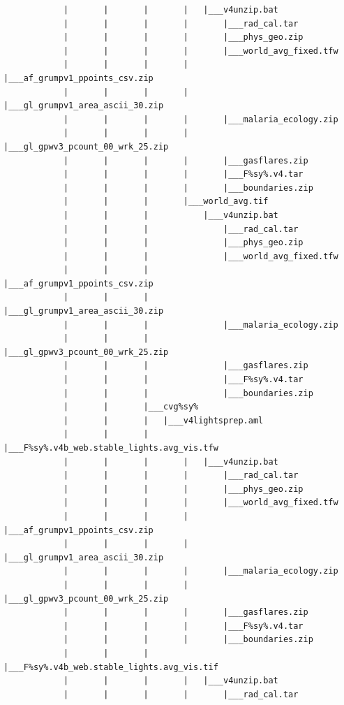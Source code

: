 \documentclass[]{book}
\begin{document}
\begin{verbatim}
            |       |       |       |   |___v4unzip.bat
            |       |       |       |       |___rad_cal.tar
            |       |       |       |       |___phys_geo.zip
            |       |       |       |       |___world_avg_fixed.tfw
            |       |       |       |       |___af_grumpv1_ppoints_csv.zip
            |       |       |       |       |___gl_grumpv1_area_ascii_30.zip
            |       |       |       |       |___malaria_ecology.zip
            |       |       |       |       |___gl_gpwv3_pcount_00_wrk_25.zip
            |       |       |       |       |___gasflares.zip
            |       |       |       |       |___F%sy%.v4.tar
            |       |       |       |       |___boundaries.zip
            |       |       |       |___world_avg.tif
            |       |       |           |___v4unzip.bat
            |       |       |               |___rad_cal.tar
            |       |       |               |___phys_geo.zip
            |       |       |               |___world_avg_fixed.tfw
            |       |       |               |___af_grumpv1_ppoints_csv.zip
            |       |       |               |___gl_grumpv1_area_ascii_30.zip
            |       |       |               |___malaria_ecology.zip
            |       |       |               |___gl_gpwv3_pcount_00_wrk_25.zip
            |       |       |               |___gasflares.zip
            |       |       |               |___F%sy%.v4.tar
            |       |       |               |___boundaries.zip
            |       |       |___cvg%sy%
            |       |       |   |___v4lightsprep.aml
            |       |       |       |___F%sy%.v4b_web.stable_lights.avg_vis.tfw
            |       |       |       |   |___v4unzip.bat
            |       |       |       |       |___rad_cal.tar
            |       |       |       |       |___phys_geo.zip
            |       |       |       |       |___world_avg_fixed.tfw
            |       |       |       |       |___af_grumpv1_ppoints_csv.zip
            |       |       |       |       |___gl_grumpv1_area_ascii_30.zip
            |       |       |       |       |___malaria_ecology.zip
            |       |       |       |       |___gl_gpwv3_pcount_00_wrk_25.zip
            |       |       |       |       |___gasflares.zip
            |       |       |       |       |___F%sy%.v4.tar
            |       |       |       |       |___boundaries.zip
            |       |       |       |___F%sy%.v4b_web.stable_lights.avg_vis.tif
            |       |       |       |   |___v4unzip.bat
            |       |       |       |       |___rad_cal.tar

\end{verbatim}
\end{document}
